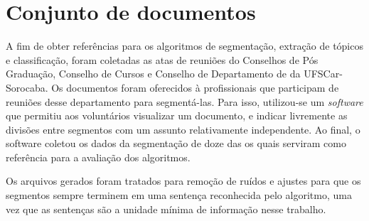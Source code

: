 
\section{Conjunto de documentos}
	\label{sec:conjutodedocumentos} 

%

%
A fim de obter referências para os algoritmos de segmentação, extração de tópicos e classificação, foram coletadas as atas de reuniões do Conselhos de Pós Graduação, Conselho de Cursos e Conselho de Departamento de da UFSCar-Sorocaba. Os documentos foram oferecidos à profissionais que participam de reuniões desse departamento para segmentá-las. Para isso, utilizou-se um \textit{software} que permitiu aos voluntários visualizar um documento, e indicar livremente as divisões entre segmentos com um assunto relativamente independente. Ao final, o software coletou os dados da segmentação de doze das os quais serviram como referência para a avaliação dos algoritmos.

Os arquivos gerados foram tratados para remoção de ruídos e ajustes para que os segmentos sempre terminem em uma sentença reconhecida pelo algoritmo, uma vez que as sentenças são a unidade mínima de informação nesse trabalho.






















